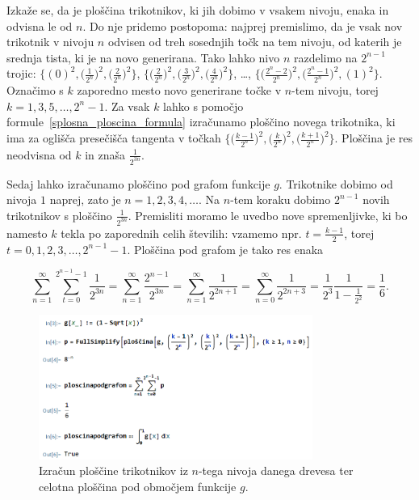 \documentclass[a4paper, 12pt, titlepage]{article}
\begin{document}
Izkaže se, da je ploščina trikotnikov, ki jih dobimo v vsakem nivoju, enaka in odvisna le od $ n $. Do nje pridemo postopoma: najprej premislimo, da je vsak nov trikotnik v nivoju $ n $ odvisen od treh sosednjih točk na tem nivoju, od katerih je srednja tista, ki je na novo generirana. Tako lahko nivo $ n $ razdelimo na $ 2^{n-1} $ trojic: $ \{(0)^2, \bigl(\frac{1}{2^n}\bigr)^2,\bigl(\frac{2}{2^n}\bigr)^2\} $, $ \{\bigl(\frac{2}{2^n}\bigr)^2, \bigl(\frac{3}{2^n}\bigr)^2, \bigl(\frac{4}{2^n}\bigr)^2\} $, \ldots, $ \{\bigl(\frac{2^n-2}{2^n}\bigr)^2, \bigl(\frac{2^n-1}{2^n}\bigr)^2, (1)^2\}$. Označimo s $ k $ zaporedno mesto novo generirane točke v $ n $-tem nivoju, torej $ k = 1, 3, 5, \ldots, 2^n-1 $. Za vsak $ k $ lahko s pomočjo formule~\ref{splosna_ploscina_formula} izračunamo ploščino novega trikotnika, ki ima za oglišča presečišča tangenta v točkah $ \{\bigl(\frac{k-1}{2^n}\bigr)^2, \bigl(\frac{k}{2^n}\bigr)^2, \bigl(\frac{k+1}{2^n}\bigr)^2\} $. Ploščina je res neodvisna od $ k $ in znaša $ \frac{1}{2^{3n}} $.

Sedaj lahko izračunamo ploščino pod grafom funkcije $ g $. Trikotnike dobimo od nivoja $ 1 $ naprej, zato je $ n = 1, 2, 3, 4, \ldots $. Na $ n $-tem koraku dobimo $ 2^{n-1} $ novih trikotnikov s ploščino $ \frac{1}{2^{3n}} $. Premisliti moramo le uvedbo nove spremenljivke, ki bo namesto $ k $ tekla po zaporednih celih številih: vzamemo npr. $ t = \frac{k-1}{2} $, torej $ t = 0, 1, 2, 3, \ldots, 2^{n-1}-1 $. Ploščina pod grafom je tako res enaka

\begin{equation*}
    \sum_{n=1}^{\infty} \sum_{t=0}^{2^{n-1}-1} \frac{1}{2^{3n}} = \sum_{n=1}^{\infty} \frac{2^{n-1}}{2^{3n}} = \sum_{n=1}^{\infty} \frac{1}{2^{2n+1}} = \sum_{n=0}^{\infty} \frac{1}{2^{2n+3}} = \frac{1}{2^3} \frac{1}{1-\frac{1}{2^2}} = \frac{1}{6}\text{.}
\end{equation*}

\begin{figure}[h!]
    \centering
    \includegraphics[width=0.8\textwidth]{slike/ilustrativen_primer_wolfram.png}
    \caption{Izračun ploščine trikotnikov iz $ n $-tega nivoja danega drevesa ter celotna ploščina pod območjem funkcije $ g $.}
    \label{ilustrativen_primer_wolfram}
\end{figure}
\end{document}
